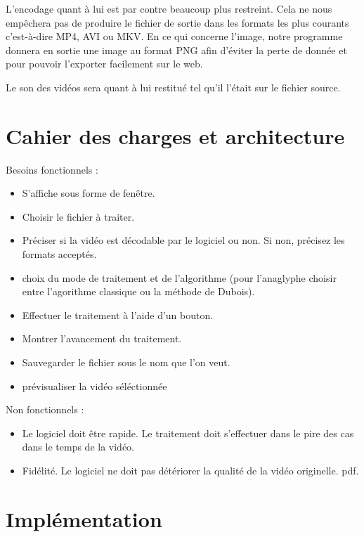 \documentclass[10pt,a4paper]{article}
\begin{document}
L'encodage quant à lui est par contre beaucoup plus restreint. Cela ne nous empêchera pas de produire
le fichier de sortie dans les formats les plus courants c'est-à-dire MP4, AVI ou MKV.
En ce qui concerne l'image, notre programme donnera en sortie une image au format PNG afin d'éviter la perte de donnée et
pour pouvoir l'exporter facilement sur le web.

Le son des vidéos sera quant à lui restitué tel qu'il l'était sur le fichier source.

\section{Cahier des charges et architecture}

Besoins fonctionnels :\newline
\begin{itemize}
\item S'affiche sous forme de fenêtre.
\item Choisir le fichier à traiter.
\item Préciser si la vidéo est décodable par le logiciel ou non. Si non, précisez les formats acceptés.
\item choix du mode de traitement et de l'algorithme (pour l'anaglyphe choisir entre l'agorithme classique ou la méthode
de Dubois).
\item Effectuer le traitement à l'aide d'un bouton.
\item Montrer l'avancement du traitement.
\item Sauvegarder le fichier sous le nom que l'on veut.
\item prévisualiser la vidéo séléctionnée\newline
\end{itemize}

Non fonctionnels :\newline
\begin{itemize}
\item Le logiciel doit être rapide. Le traitement doit s'effectuer dans le pire des cas dans le temps de la vidéo.
\item Fidélité. Le logiciel ne doit pas détériorer la qualité de la vidéo originelle.
pdf.\newline
\end{itemize}



\section{Implémentation}
\end{document}
